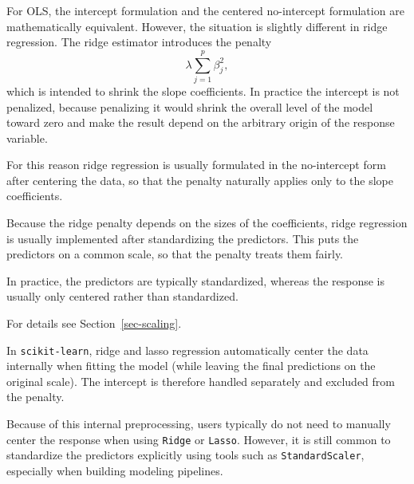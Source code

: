 \documentclass[
  letterpaper,
  DIV=11,
  numbers=noendperiod]{scrreprt}
\theoremstyle{definition}
\theoremstyle{definition}
\theoremstyle{plain}
\theoremstyle{plain}
\theoremstyle{remark}
\begin{document}
For OLS, the intercept formulation and the centered no-intercept
formulation are mathematically equivalent. However, the situation is
slightly different in ridge regression. The ridge estimator introduces
the penalty \[
\lambda \sum_{j=1}^{p} \beta_j^2 ,
\] which is intended to shrink the slope coefficients. In practice the
intercept is not penalized, because penalizing it would shrink the
overall level of the model toward zero and make the result depend on the
arbitrary origin of the response variable.

For this reason ridge regression is usually formulated in the
no-intercept form after centering the data, so that the penalty
naturally applies only to the slope coefficients.

\begin{tcolorbox}[enhanced jigsaw, arc=.35mm, bottomrule=.15mm, bottomtitle=1mm, breakable, colback=white, colbacktitle=quarto-callout-note-color!10!white, colframe=quarto-callout-note-color-frame, coltitle=black, left=2mm, leftrule=.75mm, opacityback=0, opacitybacktitle=0.6, rightrule=.15mm, title=\textcolor{quarto-callout-note-color}{\faInfo}\hspace{0.5em}{Standardization in Practice}, titlerule=0mm, toprule=.15mm, toptitle=1mm]

Because the ridge penalty depends on the sizes of the coefficients,
ridge regression is usually implemented after standardizing the
predictors. This puts the predictors on a common scale, so that the
penalty treats them fairly.

In practice, the predictors are typically standardized, whereas the
response is usually only centered rather than standardized.

For details see Section~\ref{sec-scaling}.

\end{tcolorbox}

\begin{tcolorbox}[enhanced jigsaw, arc=.35mm, bottomrule=.15mm, bottomtitle=1mm, breakable, colback=white, colbacktitle=quarto-callout-note-color!10!white, colframe=quarto-callout-note-color-frame, coltitle=black, left=2mm, leftrule=.75mm, opacityback=0, opacitybacktitle=0.6, rightrule=.15mm, title=\textcolor{quarto-callout-note-color}{\faInfo}\hspace{0.5em}{Implementation in \texttt{scikit-learn}}, titlerule=0mm, toprule=.15mm, toptitle=1mm]

In \texttt{scikit-learn}, ridge and lasso regression automatically
center the data internally when fitting the model (while leaving the
final predictions on the original scale). The intercept is therefore
handled separately and excluded from the penalty.

Because of this internal preprocessing, users typically do not need to
manually center the response when using \texttt{Ridge} or
\texttt{Lasso}. However, it is still common to standardize the
predictors explicitly using tools such as \texttt{StandardScaler},
especially when building modeling pipelines.

\end{tcolorbox}
\end{document}
